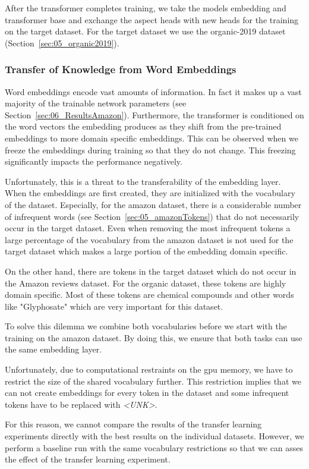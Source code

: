 After the transformer completes training, we take the models embedding and transformer base and exchange the aspect heads with new heads for the training on the target dataset. For the target dataset we use  the organic-2019 dataset {(Section~\ref{sec:05_organic2019})}.
\bigskip

\subsubsection*{Transfer of Knowledge from Word Embeddings}

Word embeddings encode vast amounts of information. In fact it makes up a vast majority of the trainable network parameters {(see Section~\ref{sec:06_ResultsAmazon})}. Furthermore, the transformer is conditioned on the word vectors the embedding produces as they shift from the pre-trained embeddings to more domain specific embeddings. This can be observed when we freeze the embeddings during training so that they do not change. This freezing significantly impacts the performance negatively.
\medskip

Unfortunately, this is a threat to the transferability of the embedding layer. When the embeddings are first created, they are initialized with the vocabulary of the dataset. Especially, for the amazon dataset, there is a considerable number of infrequent words {(see Section~\ref{sec:05_amazonTokens})} that do not necessarily occur in the target dataset. Even when removing the most infrequent tokens a large percentage of the vocabulary from the amazon dataset is not used for the target dataset which makes a large portion of the embedding domain specific. 
\medskip

On the other hand, there are tokens in the target dataset which do not occur in the Amazon reviews dataset. For the organic dataset, these tokens are highly domain specific. Most of these tokens are chemical compounds and other words like "Glyphosate" which are very important for this dataset.
\medskip

To solve this dilemma we combine both vocabularies before we start with the training on the amazon dataset. By doing this, we ensure that both tasks can use the same embedding layer. 

Unfortunately, due to computational restraints on the \gls{gpu} memory, we have to restrict the size of the shared vocabulary further. This restriction implies that we can not create embeddings for every token in the dataset and some infrequent tokens have to be replaced with \textit{<UNK>}.
\medskip

For this reason, we cannot compare the results of the transfer learning experiments directly with the best results on the individual datasets. However, we perform a baseline run with the same vocabulary restrictions so that we can asses the effect of the transfer learning experiment.